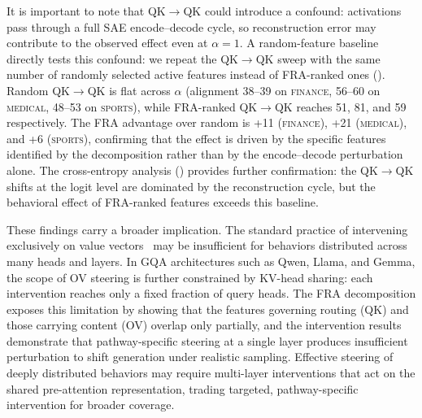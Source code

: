 \documentclass{article}
\theoremstyle{plain}
\theoremstyle{definition}
\theoremstyle{remark}
\begin{document}
It is important to note that QK$\to$QK could introduce a confound: activations pass through a full SAE encode--decode cycle, so reconstruction error may contribute to the observed effect even at $\alpha{=}1$. A random-feature baseline directly tests this confound: we repeat the QK$\to$QK sweep with the same number of randomly selected active features instead of FRA-ranked ones (). Random QK$\to$QK is flat across $\alpha$ (alignment 38--39 on \textsc{finance}, 56--60 on \textsc{medical}, 48--53 on \textsc{sports}), while FRA-ranked QK$\to$QK reaches 51, 81, and 59 respectively. The FRA advantage over random is +11 (\textsc{finance}), +21 (\textsc{medical}), and +6 (\textsc{sports}), confirming that the effect is driven by the specific features identified by the decomposition rather than by the encode--decode perturbation alone. The cross-entropy analysis () provides further confirmation: the QK$\to$QK shifts at the logit level are dominated by the reconstruction cycle, but the behavioral effect of FRA-ranked features exceeds this baseline.

These findings carry a broader implication. The standard practice of intervening exclusively on value vectors~\citep{marks2024sparse} may be insufficient for behaviors distributed across many heads and layers. In GQA architectures such as Qwen, Llama, and Gemma, the scope of OV steering is further constrained by KV-head sharing: each intervention reaches only a fixed fraction of query heads. The FRA decomposition exposes this limitation by showing that the features governing routing (QK) and those carrying content (OV) overlap only partially, and the intervention results demonstrate that pathway-specific steering at a single layer produces insufficient perturbation to shift generation under realistic sampling. Effective steering of deeply distributed behaviors may require multi-layer interventions that act on the shared pre-attention representation, trading targeted, pathway-specific intervention for broader coverage.




\end{document}
